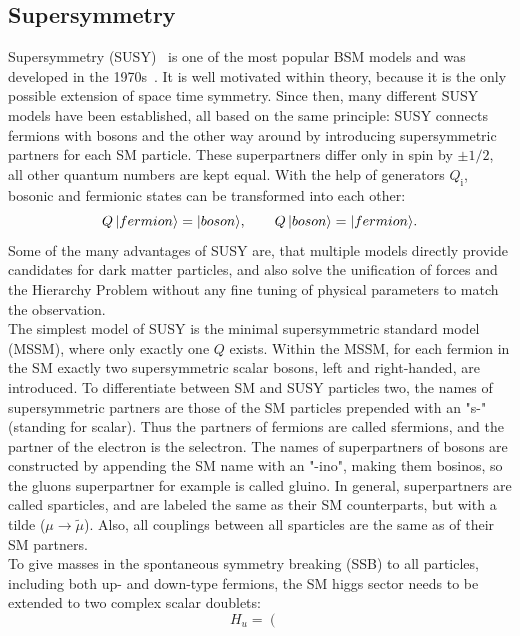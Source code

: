 \begin{enumerate}
\section{Supersymmetry}\label{sec:SUSY}
Supersymmetry (SUSY)~\cite{SUSYOriginal,SUSYPrimer} is one of the most popular BSM models and was developed in the 1970s~\cite{SUSYTheorem,HAAG1975257}. It is well motivated within theory, because it is the only possible extension of space time symmetry. Since then, many different SUSY models have been established, all based on the same principle: SUSY connects fermions with bosons and the other way around by introducing supersymmetric partners for each SM particle. These superpartners differ only in spin by $\pm1/2$, all other quantum numbers are kept equal. With the help of generators $Q_\text{i}$, bosonic and fermionic states can be transformed into each other:
\begin{equation}
 Q\,\lvert fermion\rangle=\lvert boson\rangle,~~~~~~ Q\,\lvert boson\rangle=\lvert fermion\rangle.
\end{equation}
Some of the many advantages of SUSY are, that multiple models directly provide candidates for dark matter particles, and also solve the unification of forces and the Hierarchy Problem without any fine tuning of physical parameters to match the observation.\\
The simplest model of SUSY is the minimal supersymmetric standard model (MSSM), where only exactly one $Q$ exists. Within the MSSM, for each fermion in the SM exactly two supersymmetric scalar bosons, left and right-handed, are introduced. To differentiate between SM and SUSY particles two, the names of supersymmetric partners are those of the SM particles prepended with an "s-" (standing for scalar). Thus the partners of fermions are called sfermions, and \eg the partner of the electron is the selectron. The names of superpartners of bosons are constructed by appending the SM name with an "-ino", making them bosinos, so the gluons superpartner for example is called gluino. In general, superpartners are called sparticles, and are labeled the same as their SM counterparts, but with a tilde ($\mu \to \widetilde{\mu}$). Also, all couplings between all sparticles are the same as of their SM partners.\\
To give masses in the spontaneous symmetry breaking (SSB) to all particles, including both up- and down-type fermions, the SM higgs sector needs to be extended to two complex scalar doublets:
\begin{equation}
 H_u=  \left(
 \begin{matrix}

\end{matrix}
\end{equation}
\end{enumerate}

